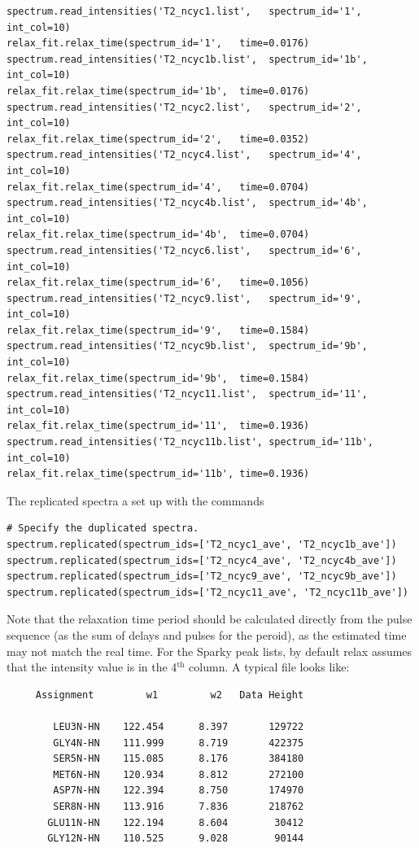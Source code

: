 \begin{lstlisting}[numbers=none]
spectrum.read_intensities('T2_ncyc1.list',   spectrum_id='1', int_col=10)
relax_fit.relax_time(spectrum_id='1',   time=0.0176)
spectrum.read_intensities('T2_ncyc1b.list',  spectrum_id='1b', int_col=10)
relax_fit.relax_time(spectrum_id='1b',  time=0.0176)
spectrum.read_intensities('T2_ncyc2.list',   spectrum_id='2', int_col=10)
relax_fit.relax_time(spectrum_id='2',   time=0.0352)
spectrum.read_intensities('T2_ncyc4.list',   spectrum_id='4', int_col=10)
relax_fit.relax_time(spectrum_id='4',   time=0.0704)
spectrum.read_intensities('T2_ncyc4b.list',  spectrum_id='4b', int_col=10)
relax_fit.relax_time(spectrum_id='4b',  time=0.0704)
spectrum.read_intensities('T2_ncyc6.list',   spectrum_id='6', int_col=10)
relax_fit.relax_time(spectrum_id='6',   time=0.1056)
spectrum.read_intensities('T2_ncyc9.list',   spectrum_id='9', int_col=10)
relax_fit.relax_time(spectrum_id='9',   time=0.1584)
spectrum.read_intensities('T2_ncyc9b.list',  spectrum_id='9b', int_col=10)
relax_fit.relax_time(spectrum_id='9b',  time=0.1584)
spectrum.read_intensities('T2_ncyc11.list',  spectrum_id='11', int_col=10)
relax_fit.relax_time(spectrum_id='11',  time=0.1936)
spectrum.read_intensities('T2_ncyc11b.list', spectrum_id='11b', int_col=10)
relax_fit.relax_time(spectrum_id='11b', time=0.1936)
\end{lstlisting}

The replicated spectra a set up with the commands

\begin{lstlisting}[firstnumber=47]
# Specify the duplicated spectra.
spectrum.replicated(spectrum_ids=['T2_ncyc1_ave', 'T2_ncyc1b_ave'])
spectrum.replicated(spectrum_ids=['T2_ncyc4_ave', 'T2_ncyc4b_ave'])
spectrum.replicated(spectrum_ids=['T2_ncyc9_ave', 'T2_ncyc9b_ave'])
spectrum.replicated(spectrum_ids=['T2_ncyc11_ave', 'T2_ncyc11b_ave'])
\end{lstlisting}

Note that the relaxation time period should be calculated directly from the pulse sequence (as the sum of delays and pulses for the peroid), as the estimated time may not match the real time.   For the Sparky peak lists, by default relax assumes that the intensity value is in the 4$^\textrm{th}$ column.  A typical file looks like:

{\scriptsize \begin{verbatim}
     Assignment         w1         w2   Data Height

        LEU3N-HN    122.454      8.397       129722
        GLY4N-HN    111.999      8.719       422375
        SER5N-HN    115.085      8.176       384180
        MET6N-HN    120.934      8.812       272100
        ASP7N-HN    122.394      8.750       174970
        SER8N-HN    113.916      7.836       218762
       GLU11N-HN    122.194      8.604        30412
       GLY12N-HN    110.525      9.028        90144
\end{verbatim}}

